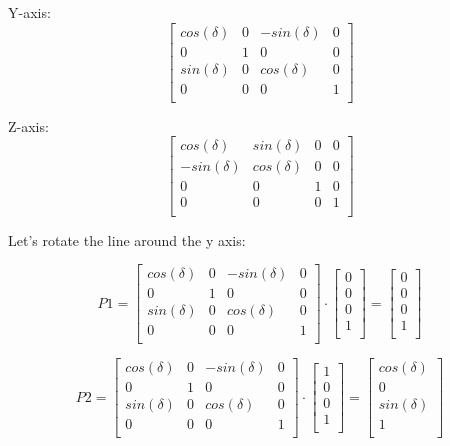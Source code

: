 \documentclass[12pt]{report} \usepackage{preamble}
\begin{document}
Y-axis: \[
	\begin{bmatrix}
		cos(\delta) & 0 & -sin(\delta) & 0 \\
		0           & 1 & 0            & 0 \\
		sin(\delta) & 0 & cos(\delta)  & 0 \\
		0           & 0 & 0            & 1 \\
	\end{bmatrix}
\]

Z-axis: \[
	\begin{bmatrix}
		cos(\delta)  & sin(\delta) & 0 & 0 \\
		-sin(\delta) & cos(\delta) & 0 & 0 \\
		0            & 0           & 1 & 0 \\
		0            & 0           & 0 & 1 \\
	\end{bmatrix}
\]

Let's rotate the line around the y axis:

\[
	P1 =
	\begin{bmatrix}
		cos(\delta) & 0 & -sin(\delta) & 0 \\
		0           & 1 & 0            & 0 \\
		sin(\delta) & 0 & cos(\delta)  & 0 \\
		0           & 0 & 0            & 1 \\
	\end{bmatrix}
	\cdot
	\begin{bmatrix}
		0 \\
		0 \\
		0 \\
		1 \\
	\end{bmatrix}
	=
	\begin{bmatrix}
		0 \\
		0 \\
		0 \\
		1 \\
	\end{bmatrix}
\]

\[
	P2 =
	\begin{bmatrix}
		cos(\delta) & 0 & -sin(\delta) & 0 \\
		0           & 1 & 0            & 0 \\
		sin(\delta) & 0 & cos(\delta)  & 0 \\
		0           & 0 & 0            & 1 \\
	\end{bmatrix}
	\cdot
	\begin{bmatrix}
		1 \\
		0 \\
		0 \\
		1 \\
	\end{bmatrix}
	=
	\begin{bmatrix}
		cos(\delta) \\
		0           \\
		sin(\delta) \\
		1           \\
	\end{bmatrix}
\]
\end{document}

